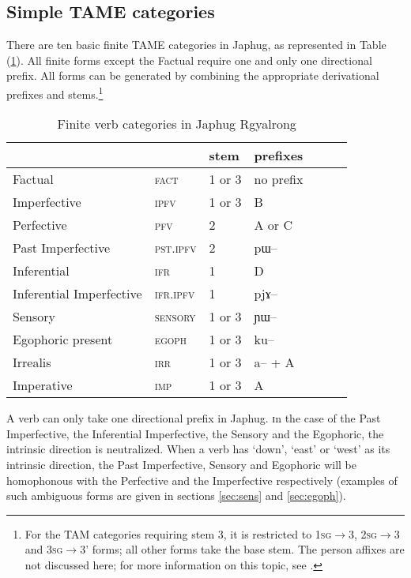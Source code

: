 \documentclass[oldfontcommands,oneside,a4paper,11pt]{article}
\newcommand{\ipa}[1]{{\phon \mbox{#1}}} %
\newcommand{\refb}[1]{(\ref{#1})}
\begin{document}
\subsection{Simple TAME categories} \label{sec:finite.TAM}
There are ten basic finite TAME categories in Japhug, as represented in Table \refb{tab:finite.forms}. All finite forms except the Factual require one and only one directional prefix. All forms can be generated  by combining the appropriate derivational prefixes and stems.\footnote{For the TAM categories requiring stem 3, it is restricted to  \textsc{1sg}$\rightarrow$3, \textsc{2sg}$\rightarrow$3 and \textsc{3sg}$\rightarrow$3' forms; all other forms take the base stem.  The person affixes  are not discussed here; for  more information on this topic, see \citet{jacques10inverse}.}

\begin{table}[H]
\caption{Finite verb categories in Japhug Rgyalrong} \label{tab:finite.forms} \centering
\begin{tabular}{lllllll}
\toprule
&	&	stem&	prefixes\\
\midrule
Factual&	\textsc{fact} &	1 or 3&	no prefix\\
Imperfective&	\textsc{ipfv} &	1 or 3&	B\\
Perfective&	\textsc{pfv} &	2&	A or C\\
Past Imperfective&	\textsc{pst.ipfv} &	2&	\ipa{pɯ--}\\
Inferential&	\textsc{ifr} &	1&	D\\
Inferential Imperfective&	\textsc{ifr.ipfv} &	1&	\ipa{pjɤ--}\\
Sensory&	\textsc{sensory} &	1 or 3&	\ipa{ɲɯ--}\\
Egophoric present&	\textsc{egoph} &	1 or 3&	\ipa{ku--}\\
Irrealis&	\textsc{irr} &	1 or 3&	\ipa{a--} + A\\
Imperative&	\textsc{imp} &	1 or 3&	A\\
\bottomrule
\end{tabular}
\end{table}

A verb can only take one directional prefix in Japhug. ɪn the case of the Past Imperfective, the Inferential Imperfective, the Sensory and the Egophoric, the intrinsic direction is neutralized. When a verb has `down', `east' or `west' as its intrinsic direction, the Past Imperfective, Sensory and Egophoric will be homophonous with the Perfective and the Imperfective respectively (examples of such ambiguous forms are given in sections \ref{sec:sens} and \ref{sec:egoph}).
\end{document}
